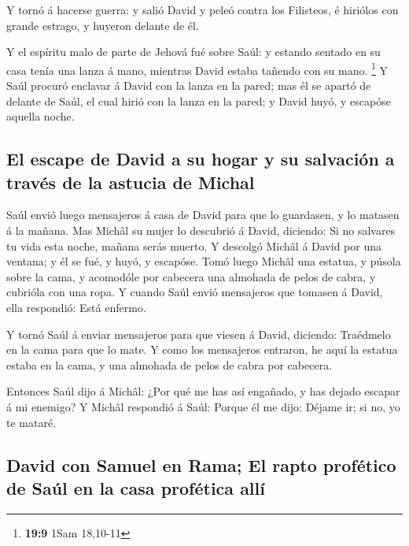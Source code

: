  Y tornó á hacerse guerra: y salió David y peleó contra
los Filisteos, é hiriólos con grande estrago, y huyeron delante de él.

 Y el espíritu malo de parte de Jehová fué sobre Saúl: y
estando sentado en su casa tenía una lanza á mano, mientras David estaba
tañendo con su mano. \footnote{\textbf{19:9} 1Sam 18,10-11}
 Y Saúl procuró enclavar á David con la lanza en la
pared; mas él se apartó de delante de Saúl, el cual hirió con la lanza
en la pared; y David huyó, y escapóse aquella noche.

\hypertarget{el-escape-de-david-a-su-hogar-y-su-salvaciuxf3n-a-travuxe9s-de-la-astucia-de-michal}{%
\subsection{El escape de David a su hogar y su salvación a través de la
astucia de
Michal}\label{el-escape-de-david-a-su-hogar-y-su-salvaciuxf3n-a-travuxe9s-de-la-astucia-de-michal}}

 Saúl envió luego mensajeros á casa de David para que lo
guardasen, y lo matasen á la mañana. Mas Michâl su mujer lo descubrió á
David, diciendo: Si no salvares tu vida esta noche, mañana serás muerto.
 Y descolgó Michâl á David por una ventana; y él se fué,
y huyó, y escapóse.  Tomó luego Michâl una estatua, y
púsola sobre la cama, y acomodóle por cabecera una almohada de pelos de
cabra, y cubrióla con una ropa.  Y cuando Saúl envió
mensajeros que tomasen á David, ella respondió: Está enfermo.

 Y tornó Saúl á enviar mensajeros para que viesen á
David, diciendo: Traédmelo en la cama para que lo mate. 
Y como los mensajeros entraron, he aquí la estatua estaba en la cama, y
una almohada de pelos de cabra por cabecera.

 Entonces Saúl dijo á Michâl: ¿Por qué me has así
engañado, y has dejado escapar á mi enemigo? Y Michâl respondió á Saúl:
Porque él me dijo: Déjame ir; si no, yo te mataré.

\hypertarget{david-con-samuel-en-rama-el-rapto-profuxe9tico-de-sauxfal-en-la-casa-profuxe9tica-alluxed}{%
\subsection{David con Samuel en Rama; El rapto profético de Saúl en la
casa profética
allí}\label{david-con-samuel-en-rama-el-rapto-profuxe9tico-de-sauxfal-en-la-casa-profuxe9tica-alluxed}}

